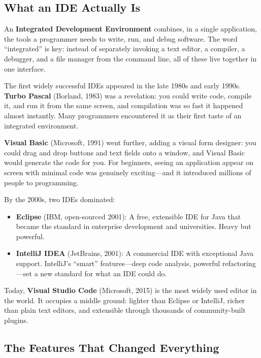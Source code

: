 \documentclass[11pt,letterpaper]{article}
\newcommand{\keyterm}[1]{\textbf{\textcolor{cssecondary}{#1}}}
\begin{document}
\subsection{What an IDE Actually Is}

An \keyterm{Integrated Development Environment} combines, in a single application, the tools a programmer needs to write, run, and debug software. The word ``integrated'' is key: instead of separately invoking a text editor, a compiler, a debugger, and a file manager from the command line, all of these live together in one interface.

\begin{historybox}
The first widely successful IDEs appeared in the late 1980s and early 1990s. \textbf{Turbo Pascal} (Borland, 1983) was a revelation: you could write code, compile it, and run it from the same screen, and compilation was so fast it happened almost instantly. Many programmers encountered it as their first taste of an integrated environment.

\textbf{Visual Basic} (Microsoft, 1991) went further, adding a visual form designer: you could drag and drop buttons and text fields onto a window, and Visual Basic would generate the code for you. For beginners, seeing an application appear on screen with minimal code was genuinely exciting---and it introduced millions of people to programming.
\end{historybox}

By the 2000s, two IDEs dominated:

\begin{itemize}[itemsep=4pt]
    \item \textbf{Eclipse} (IBM, open-sourced 2001): A free, extensible IDE for Java that became the standard in enterprise development and universities. Heavy but powerful.
    \item \textbf{IntelliJ IDEA} (JetBrains, 2001): A commercial IDE with exceptional Java support. IntelliJ's ``smart'' features---deep code analysis, powerful refactoring---set a new standard for what an IDE could do.
\end{itemize}

Today, \textbf{Visual Studio Code} (Microsoft, 2015) is the most widely used editor in the world. It occupies a middle ground: lighter than Eclipse or IntelliJ, richer than plain text editors, and extensible through thousands of community-built plugins.

\subsection{The Features That Changed Everything}
\end{document}

